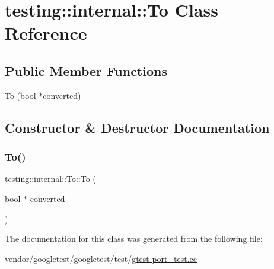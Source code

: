 \hypertarget{classtesting_1_1internal_1_1_to}{}\section{testing\+:\+:internal\+:\+:To Class Reference}
\label{classtesting_1_1internal_1_1_to}
\subsection*{Public Member Functions}
\begin{DoxyCompactItemize}
\item 
\hyperlink{classtesting_1_1internal_1_1_to_a447354e55d855ed0f1a1de8b2b54d345}{To} (bool $\ast$converted)
\end{DoxyCompactItemize}


\subsection{Constructor \& Destructor Documentation}
\mbox{\label{classtesting_1_1internal_1_1_to_a447354e55d855ed0f1a1de8b2b54d345}} 
\subsubsection{\texorpdfstring{To()}{To()}}
{\footnotesize\ttfamily testing\+::internal\+::\+To\+::\+To (\begin{DoxyParamCaption}\item[{bool $\ast$}]{converted }\end{DoxyParamCaption})\hspace{0.3cm}{\ttfamily [inline]}}



The documentation for this class was generated from the following file\+:\begin{DoxyCompactItemize}
\item 
vendor/googletest/googletest/test/\hyperlink{gtest-port__test_8cc}{gtest-\/port\+\_\+test.\+cc}\end{DoxyCompactItemize}
